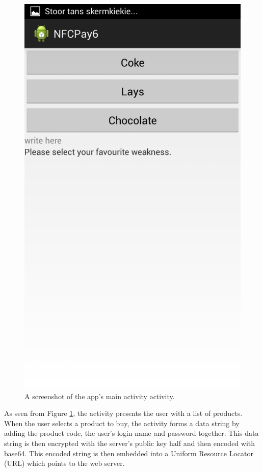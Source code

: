 \begin{figure}
 \centering 
 \includegraphics[clip = true, trim = 0 520 0 60,
 scale=0.2]{main_menu}
 \caption{A screenshot of the app's main activity activity.}
 \label{fig:main-activity-screenshot}
\end{figure}

As seen from Figure \ref{fig:main-activity-screenshot}, the activity presents
the user with a list of products. When the user selects a product to buy, the
activity forms a data string by adding the product code, the user's login
name and password together. This data string is then encrypted with the
server's public key half and then encoded with base64. This encoded string
is then embedded into a Uniform Resource Locator (URL) which points to the
web server. 

